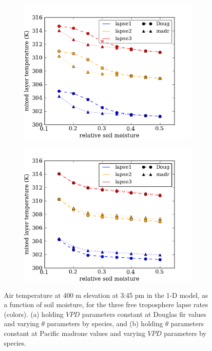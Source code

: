 \begin{figure}[here]
\begin{subfigure}{0.5\textwidth}
\includegraphics[width=\textwidth]{ch2-BL/figures/theta_afternoon_T.png}
\caption{}
\end{subfigure}
\begin{subfigure}{0.5\textwidth}
\includegraphics[width=\textwidth]{ch2-BL/figures/VPD_afternoon_T.png}
\caption{}
\end{subfigure}
\caption{Air temperature at 400 m elevation at 3:45 pm in the 1-D model, as a function of soil moisture, for the three free troposphere lapse rates (colors).  (a) holding $VPD$ parameters constant at Douglas fir values and varying $\theta$ parameters by species, and (b) holding $\theta$ parameters constant at Pacific madrone values and varying $VPD$ parameters by species.}
\label{fig:BL_testVPDtheta}
\end{figure}

